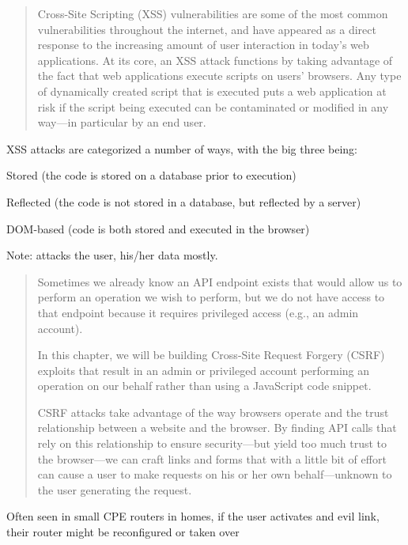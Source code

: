 \documentclass[Screen16to9,17pt]{foils}
\newcommand{\quotesize}{\fontsize{16pt}{20pt}\selectfont}
\begin{document}

\begin{quote}\quotesize
  Cross-Site Scripting (XSS) vulnerabilities are some of the most common vulnerabilities throughout the internet, and have appeared as a direct response to the increasing
  amount of user interaction in today’s web applications.
  At its core, an XSS attack functions by taking advantage of the fact that web applications execute scripts on users’ browsers. Any type of dynamically created script that is
  executed puts a web application at risk if the script being executed can be contaminated or modified in any way—in particular by an end user.
\end{quote}

XSS attacks are categorized a number of ways, with the big three being:
\begin{list2}
  \item Stored (the code is stored on a database prior to execution)
\item Reflected (the code is not stored in a database, but reflected by a server)
\item DOM-based (code is both stored and executed in the browser)
\end{list2}

Note: attacks the user, his/her data mostly.


\begin{quote}\quotesize
Sometimes we already know an API endpoint exists that would allow us to perform an operation we wish to perform, but we do not have access to that endpoint because it requires privileged access (e.g., an admin account).

In this chapter, we will be building Cross-Site Request Forgery (CSRF) exploits that result in an admin or privileged account performing an operation on our behalf rather than using a JavaScript code snippet.

CSRF attacks take advantage of the way browsers operate and the trust relationship between a website and the browser. By finding API calls that rely on this relationship to ensure security—but yield too much trust to the browser—we can craft links and forms that with a little bit of effort can cause a user to make requests on his or her own behalf—unknown to the user generating the request.
\end{quote}

\begin{list2}
  \item Often seen in small CPE routers in homes, if the user activates and evil link, their router might be reconfigured or taken over
\end{list2}
\end{document}
